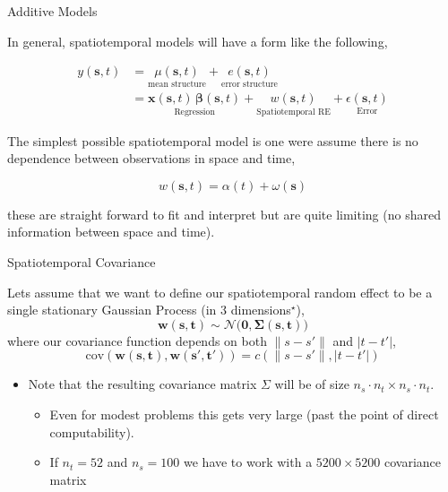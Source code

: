 \documentclass[11pt,ignorenonframetext,]{beamer}
\begin{document}
\begin{frame}[t]{Additive Models}

In general, spatiotemporal models will have a form like the following,

\[ \begin{aligned}
y(\bm{s},{t}) 
  &= \underset{\text{mean structure}}{\mu(\bm{s},{t})} + \underset{\text{error structure}}{{e}(\bm{s},{t})} \\
  &= \underset{\text{Regression}}{\bm{x}(\bm{s},{t}) \, \bm{\beta}(\bm{s},{t})} + \underset{\text{Spatiotemporal RE}}{{w}(\bm{s},{t})} + \underset{\text{Error}}{\epsilon(\bm{s},{t})}
\end{aligned} \]

\pause

\vspace{5mm}

The simplest possible spatiotemporal model is one were assume there is
no dependence between observations in space and time,

\[
w(\bm{s},t) = \alpha(t) + \omega(\bm{s})
\]

these are straight forward to fit and interpret but are quite limiting
(no shared information between space and time).

\end{frame}

\begin{frame}{Spatiotemporal Covariance}

Lets assume that we want to define our spatiotemporal random effect to
be a single stationary Gaussian Process (in 3 dimensions\(^\star\)),
\[ \bm{w}(\bm{s},\bm{t}) \sim \mathcal{N}\big(\bm{0}, \bm\Sigma(\bm{s},\bm{t})\big) \]
where our covariance function depends on both \(\lVert s-s'\rVert\) and
\(\lvert t-t'\rvert\), \[
\text{cov}(\bm{w}(\bm{s},\bm{t}), \bm{w}(\bm{s}',\bm{t}')) = c(\lVert s-s'\rVert, \lvert t-t'\rvert)
\]

\begin{itemize}
\item
  Note that the resulting covariance matrix \(\Sigma\) will be of size
  \(n_s \cdot n_t \times n_s \cdot n_t\).

  \begin{itemize}
  \item
    Even for modest problems this gets very large (past the point of
    direct computability).
  \item
    If \(n_t = 52\) and \(n_s = 100\) we have to work with a
    \(5200 \times 5200\) covariance matrix
  \end{itemize}
\end{itemize}

\end{frame}
\end{document}
